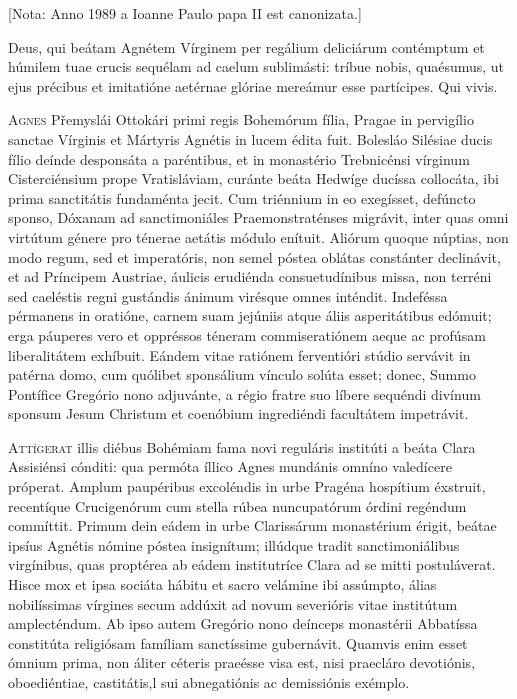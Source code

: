 \begin{caputFesti}

  [Nota: Anno 1989 a Ioanne Paulo papa II est canonizata.]
\end{caputFesti}

\parsOratio

Deus, qui beátam Agnétem Vírginem
per regálium deliciárum contémptum
et húmilem tuae crucis sequélam
ad caelum sublimásti:
tríbue nobis, quaésumus,
ut ejus précibus et imitatióne
aetérnae glóriae mereámur esse partícipes.
Qui vivis.

\horaNocturnusII


\lettrine{A}{gnes} Přemyslái Ottokári primi regis Bohemórum fília,
Pragae in pervigílio sanctae Vírginis et Mártyris Agnétis
in lucem édita fuit.
Bolesláo Silésiae ducis fílio deínde desponsáta a paréntibus,
et in monastério Trebnicénsi vírginum Cisterciénsium
prope Vratisláviam,
curánte beáta Hedwíge ducíssa collocáta,
ibi prima sanctitátis fundaménta jecit.
Cum triénnium in eo exegísset, defúncto sponso,
Dóxanam ad sanctimoniáles Praemonstraténses migrávit,
inter quas omni virtútum génere pro ténerae aetátis módulo enítuit.
Aliórum quoque núptias, non modo regum, sed et imperatóris,
non semel póstea oblátas constánter declinávit,
et ad Príncipem Austriae, áulicis erudiénda consuetudínibus missa,
non terréni sed caeléstis regni gustándis ánimum virésque omnes inténdit.
Indeféssa pérmanens in oratióne,
carnem suam jejúniis atque áliis asperitátibus edómuit;
erga páuperes vero et oppréssos téneram commiseratiónem aeque
ac profúsam liberalitátem exhíbuit.
Eándem vitae ratiónem ferventióri stúdio servávit in patérna domo,
cum quólibet sponsálium vínculo solúta esset;
donec, Summo Pontífice Gregório nono adjuvánte,
a régio fratre suo líbere sequéndi divínum sponsum Jesum Christum
et coenóbium ingrediéndi facultátem impetrávit.



\lettrine{A}{ttígerat} illis diébus Bohémiam fama novi reguláris
institúti a beáta Clara Assisiénsi cónditi:
qua permóta íllico Agnes mundánis omníno valedícere próperat.
Amplum paupéribus excoléndis in urbe Pragéna hospítium éxstruit,
recentíque Crucigenórum cum stella rúbea nuncupatórum órdini
regéndum commíttit.
Primum dein eádem in urbe Clarissárum monastérium érigit,
beátae ipsíus Agnétis nómine póstea insignítum;
illúdque tradit sanctimoniálibus virgínibus,
quas proptérea ab eádem institutríce Clara ad se mitti postuláverat.
Hisce mox et ipsa sociáta hábitu et sacro velámine ibi assúmpto,
álias nobilíssimas vírgines secum addúxit
ad novum severióris vitae institútum amplecténdum.
Ab ipso autem Gregório nono deínceps monastérii Abbatíssa constitúta
religiósam famíliam sanctíssime gubernávit.
Quamvis enim esset ómnium prima,
non áliter céteris praeésse visa est,
nisi praecláro devotiónis, oboediéntiae, castitátis,l
sui abnegatiónis ac demissiónis exémplo.

